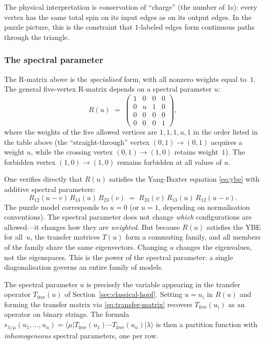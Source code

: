 The physical interpretation is conservation of ``charge'' (the number
of $1$s): every vertex has the same total spin on its input edges as
on its output edges.  In the puzzle picture, this is the constraint
that $1$-labeled edges form continuous paths through the triangle.

\subsubsection*{The spectral parameter}

The R-matrix above is the \emph{specialised} form, with all nonzero
weights equal to~$1$.  The general five-vertex R-matrix depends on a
spectral parameter $u$:
\begin{equation}
\label{eq:rmatrix-spectral}
  R(u) \;=\;
  \begin{pmatrix}
    1 & 0 & 0 & 0 \\
    0 & u & 1 & 0 \\
    0 & 0 & 0 & 0 \\
    0 & 0 & 0 & 1
  \end{pmatrix},
\end{equation}
where the weights of the five allowed vertices are $1, 1, 1, u, 1$
in the order listed in the table above (the ``straight-through''
vertex $(0,1) \to (0,1)$ acquires a weight $u$, while the crossing
vertex $(0,1) \to (1,0)$ retains weight~$1$).  The forbidden vertex
$(1,0) \to (1,0)$ remains forbidden at all values of $u$.

One verifies directly that $R(u)$ satisfies the Yang-Baxter equation
\eqref{eq:ybe} with additive spectral parameters:
\[
  R_{12}(u-v)\, R_{13}(u)\, R_{23}(v)
  \;=\;
  R_{23}(v)\, R_{13}(u)\, R_{12}(u-v).
\]
The puzzle model corresponds to $u = 0$ (or $u = 1$, depending on
normalisation conventions).  The spectral parameter does not change
\emph{which} configurations are allowed---it changes how they are
\emph{weighted}.  But because $R(u)$ satisfies the YBE for all~$u$,
the transfer matrices $T(u)$ form a commuting family, and all members
of the family share the same eigenvectors.  Changing $u$ changes the
eigenvalues, not the eigenspaces.  This is the power of the spectral
parameter: a single diagonalisation governs an entire family of
models.

\begin{remark}
The spectral parameter $u$ is precisely the variable appearing in the
transfer operator $T_{\mathrm{free}}(u)$ of Section~\ref{sec:classical-hopf}.
Setting $u = u_i$ in $R(u)$ and forming the transfer matrix via
\eqref{eq:transfer-matrix} recovers $T_{\mathrm{free}}(u_i)$ as an
operator on binary strings.  The formula
$s_{\lambda/\mu}(u_1, \ldots, u_n) = \langle\mu|
T_{\mathrm{free}}(u_1) \cdots T_{\mathrm{free}}(u_n)|\lambda\rangle$
is then a partition function with \emph{inhomogeneous} spectral
parameters, one per row.
\end{remark}

